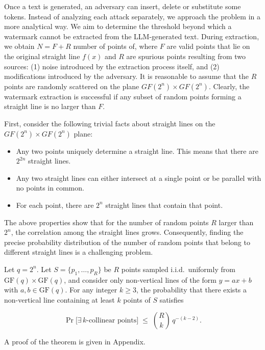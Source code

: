 \documentclass[a4paper,11pt]{llncs}
\begin{document}
Once a text is generated, an adversary can insert, delete or substitute some tokens. Instead of analyzing each attack separately, we approach the problem in a more analytical way. We aim to determine the threshold beyond which a watermark cannot be extracted from the LLM-generated text. During extraction, we obtain $N=F+R$ number of points of, where $F$ are valid points that lie on the original straight line $f(x)$ and $R$ are spurious points resulting from two sources: (1) noise introduced by the extraction process itself, and (2) modifications introduced by the adversary.
It is reasonable to assume that the $R$ points are randomly scattered on the plane $GF(2^n)\times GF(2^n)$. Clearly, the watermark extraction is successful if any subset of random points forming a straight line is no larger than $F$.

First, consider the following trivial facts about straight lines on the $GF(2^n)\times GF(2^n)$ plane:

\begin{itemize}
    \item Any two points uniquely determine a straight line. This means that there are $2^{2n}$ straight lines.
    \item Any two straight lines can either intersect at a single point or be parallel with no points in common.
    \item For each point, there are $2^n$ straight lines that contain that point.
\end{itemize}

The above properties show that for the number of random points $R$ larger than $2^n$, the correlation among the straight lines grows. Consequently, finding the precise probability distribution of the number of random points that belong to different straight lines is a challenging problem.

\begin{theorem}\label{thm:rand_collinearity}
Let $q = 2^n$. Let $S=\{p_1,\ldots,p_R\}$ be $R$ points sampled i.i.d.\ uniformly from $\mathrm{GF}(q)\times\mathrm{GF}(q)$, and consider only non-vertical lines of the form $y=ax+b$ with $a,b\in\mathrm{GF}(q)$. For any integer $k\ge 3$, the probability that there exists a non-vertical line containing at least $k$ points of $S$ satisfies

\[
    \Pr\big[\exists\, k\text{-collinear points}\big]
    \;\le\;
    \binom{R}{k}\, q^{-(k-2)}.
\]

A proof of the theorem is given in Appendix.
\end{theorem}
\end{document}
